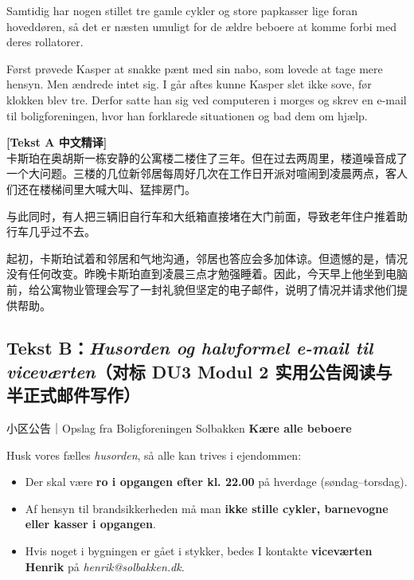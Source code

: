 Samtidig har nogen stillet tre gamle cykler og store papkasser lige foran hoveddøren, så det er næsten umuligt for de ældre beboere at komme forbi med deres rollatorer.

Først prøvede Kasper at snakke pænt med sin nabo, som lovede at tage mere hensyn. Men  ændrede intet sig. I går aftes kunne Kasper slet ikke sove, før klokken blev tre. Derfor satte han sig ved computeren i morges og skrev en  e-mail til boligforeningen, hvor han forklarede situationen og bad dem om hjælp.

\begin{transbox}
\small
\textbf{\color{NCDTeal}[Tekst A 中文精译]}\\
卡斯珀在奥胡斯一栋安静的公寓楼二楼住了三年。但在过去两周里，楼道噪音成了一个大问题。三楼的几位新邻居每周好几次在工作日开派对喧闹到凌晨两点，客人们还在楼梯间里大喊大叫、猛摔房门。

与此同时，有人把三辆旧自行车和大纸箱直接堵在大门前面，导致老年住户推着助行车几乎过不去。

起初，卡斯珀试着和邻居和气地沟通，邻居也答应会多加体谅。但遗憾的是，情况没有任何改变。昨晚卡斯珀直到凌晨三点才勉强睡着。因此，今天早上他坐到电脑前，给公寓物业管理会写了一封礼貌但坚定的电子邮件，说明了情况并请求他们提供帮助。
\end{transbox}

\subsection*{Tekst B：\textit{Husorden og halvformel e-mail til viceværten}（对标 DU3 Modul 2 实用公告阅读与半正式邮件写作）}

\begin{emailbox}{小区公告｜Opslag fra Boligforeningen Solbakken}
\textbf{Kære alle beboere}

Husk vores fælles \textit{husorden}, så alle kan trives i ejendommen:
\begin{itemize}
  \item Der skal være \textbf{ro i opgangen efter kl. 22.00} på hverdage (søndag--torsdag).
  \item Af hensyn til brandsikkerheden må man \textbf{ikke stille cykler, barnevogne eller kasser i opgangen}.
  \item Hvis noget i bygningen er gået i stykker, bedes I kontakte \textbf{viceværten Henrik} på \textit{henrik@solbakken.dk}.
\end{itemize}
\end{emailbox}


